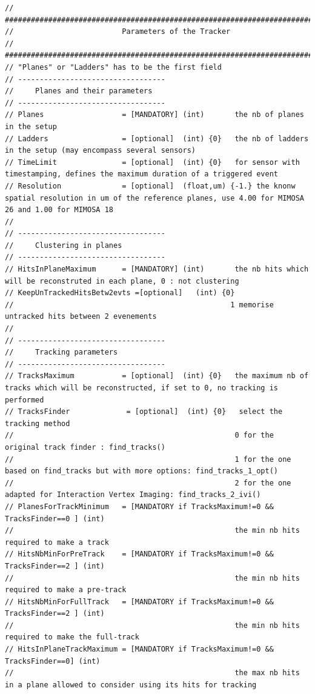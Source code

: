 \documentclass[a4paper, 12pt, twoside]{article}
\begin{document}
\begin{verbatim}
// #############################################################################
//                         Parameters of the Tracker
// #############################################################################
// "Planes" or "Ladders" has to be the first field
// ----------------------------------
//     Planes and their parameters
// ----------------------------------
// Planes                  = [MANDATORY] (int)       the nb of planes in the setup
// Ladders                 = [optional]  (int) {0}   the nb of ladders in the setup (may encompass several sensors)
// TimeLimit               = [optional]  (int) {0}   for sensor with timestamping, defines the maximum duration of a triggered event
// Resolution              = [optional]  (float,um) {-1.} the knonw spatial resolution in um of the reference planes, use 4.00 for MIMOSA 26 and 1.00 for MIMOSA 18
//
// ----------------------------------
//     Clustering in planes
// ----------------------------------
// HitsInPlaneMaximum      = [MANDATORY] (int)       the nb hits which will be reconstruted in each plane, 0 : not clustering
// KeepUnTrackedHitsBetw2evts =[optional]   (int) {0} 
//                                                  1 memorise untracked hits between 2 evenements 
//
// ----------------------------------
//     Tracking parameters
// ----------------------------------
// TracksMaximum           = [optional]  (int) {0}   the maximum nb of tracks which will be reconstructed, if set to 0, no tracking is performed
// TracksFinder             = [optional]  (int) {0}   select the tracking method
//                                                   0 for the original track finder : find_tracks()
//                                                   1 for the one based on find_tracks but with more options: find_tracks_1_opt()
//                                                   2 for the one adapted for Interaction Vertex Imaging: find_tracks_2_ivi()
// PlanesForTrackMinimum   = [MANDATORY if TracksMaximum!=0 && TracksFinder==0 ] (int)
//                                                   the min nb hits required to make a track
// HitsNbMinForPreTrack    = [MANDATORY if TracksMaximum!=0 && TracksFinder==2 ] (int)
//                                                   the min nb hits required to make a pre-track
// HitsNbMinForFullTrack   = [MANDATORY if TracksMaximum!=0 && TracksFinder==2 ] (int)
//                                                   the min nb hits required to make the full-track
// HitsInPlaneTrackMaximum = [MANDATORY if TracksMaximum!=0 && TracksFinder==0] (int) 
//                                                   the max nb hits in a plane allowed to consider using its hits for tracking

\end{verbatim}
\end{document}
